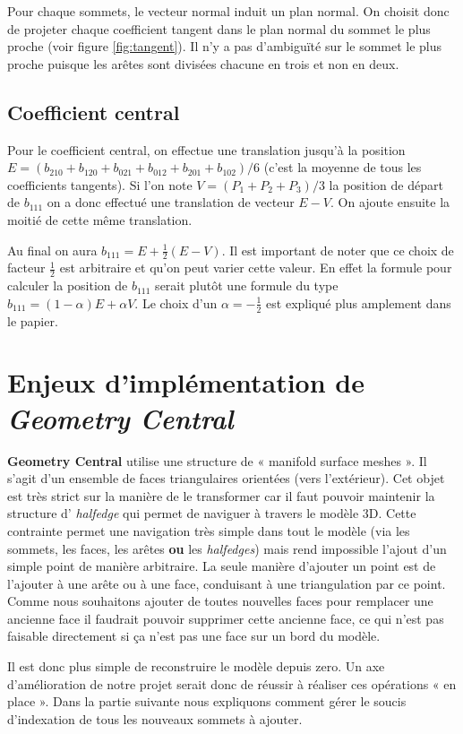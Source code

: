 \documentclass{article}
\begin{document}
Pour chaque sommets, le vecteur normal induit un plan normal. On choisit donc
de projeter chaque coefficient tangent dans le plan normal du sommet le plus
proche (voir figure \ref{fig:tangent}). Il n'y a pas d’ambiguïté sur le sommet
le plus proche puisque les arêtes sont divisées chacune en trois et non en
deux.

\subsection{Coefficient central}
Pour le coefficient central, on effectue une translation jusqu'à la position
$E=(b_{210} + b_{120} + b_{021} + b_{012} + b_{201} + b_{102})/6$ (c'est la
moyenne de tous les coefficients tangents). Si l'on note $V=(P_1 + P_2 +
P_3)/3$ la position de départ de $b_{111}$ on a donc effectué une translation
de vecteur $E-V$. On ajoute ensuite la moitié de cette même translation.

Au final on aura $b_{111} = E + \frac{1}{2}(E-V)$. Il est important de noter
que ce choix de facteur $\frac{1}{2}$ est arbitraire et qu'on peut varier cette
valeur. En effet la formule pour calculer la position de $b_{111}$ serait
plutôt une formule du type $b_{111} = (1-\alpha)E + \alpha V$. Le choix d'un
$\alpha = -\frac{1}{2}$ est expliqué plus amplement dans le papier.


\section{Enjeux d'implémentation de \textit{Geometry Central}}

\textbf{Geometry Central} utilise une structure de « manifold surface meshes ».
Il s'agit d'un ensemble de faces triangulaires orientées (vers l'extérieur).
Cet objet est très strict sur la manière de le transformer car il faut pouvoir
maintenir la structure d' \textit{halfedge} qui permet de naviguer à travers le
modèle 3D. Cette contrainte permet une navigation très simple dans tout le
modèle (via les sommets, les faces, les arêtes \textbf{ou} les
\textit{halfedges}) mais rend impossible l'ajout d'un simple point de manière
arbitraire. La seule manière d'ajouter un point est de l'ajouter à une arête ou
à une face, conduisant à une triangulation par ce point. Comme nous souhaitons
ajouter de toutes nouvelles faces pour remplacer une ancienne face il faudrait
pouvoir supprimer cette ancienne face, ce qui n'est pas faisable directement si
ça n'est pas une face sur un bord du modèle.

Il est donc plus simple de reconstruire le modèle depuis zero. Un axe
d'amélioration de notre projet serait donc de réussir à réaliser ces opérations
« en place ». Dans la partie suivante nous expliquons comment gérer le soucis
d'indexation de tous les nouveaux sommets à ajouter.
\end{document}
